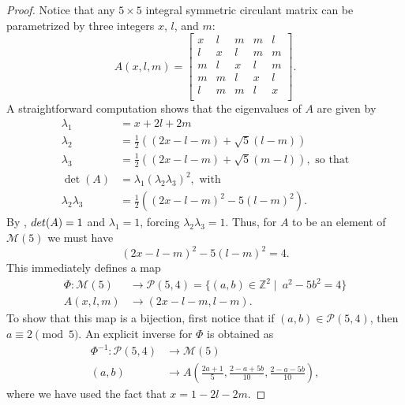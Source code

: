 \documentclass[10pt,a4paper]{amsart}
\newcommand{\Pell}{\mathcal{P}}
\newcommand{\Z}{\mathbb{Z}}
\begin{document}
\begin{proof} Notice that any $5\times 5$ integral symmetric circulant matrix can be parametrized by three integers $x$, $l$, and $m$:
\[
\renewcommand{\arraystretch}{1.25}
A(x,l,m) = \left[
\begin{matrix}
	x & l & m & m & l\\
	l & x & l & m & m\\
	m & l & x & l & m\\
	m & m & l & x & l\\
	l & m & m & l & x\\
\end{matrix}
\right].\]
A straightforward computation shows that the eigenvalues of $A$ are given by
\begin{align*}
\lambda_1&=x+2l+2m\\
\lambda_2&=\tfrac{1}{2}\left((2x-l-m)+\sqrt{5}(l-m)\right)\\
\lambda_3&=\tfrac{1}{2}\left((2x-l-m)+\sqrt{5}(m-l)\right),
\text{ so that}\\
\det(A)&=\lambda_1\left(\lambda_2\lambda_3\right)^2, \text{ with}\\
\lambda_2\lambda_3&=\tfrac{1}{2}\left((2x-l-m)^2- 5(l-m)^2\right).
\end{align*}
By , ${\rm det}(A)=1$ and $\lambda_1=1$, forcing $\lambda_2\lambda_3= 1$. Thus, for $A$ to be an element of $\mathcal{M}(5)$ we must have 
\begin{equation*}
(2x-l-m)^2- 5(l-m)^2=4.
\end{equation*}
This immediately defines a map
\begin{align*}
\Phi: \mathcal{M}(5)&\longrightarrow\Pell(5,4)=\{(a,b)\in\Z^2 \mid\ a^{2}-5b^{2}=4\}\\
A(x,l,m)&\longrightarrow(2x-l-m,l-m).
\end{align*}
To show that this map is a bijection, first notice that if $(a,b)\in\Pell(5,4)$, then $a\equiv 2 \pmod{5}$. An explicit inverse for $\Phi$ is obtained as 
\begin{align*}
\Phi^{-1}:\Pell(5,4)&\longrightarrow\mathcal{M}(5)\\
(a,b)&\longrightarrow A\left(\frac{2a+1}{5},\frac{2-a+5b}{10},\frac{2-a-5b}{10}\right),
\end{align*}
where we have used the fact that $x=1-2l-2m$.
\end{proof}
\end{document}
